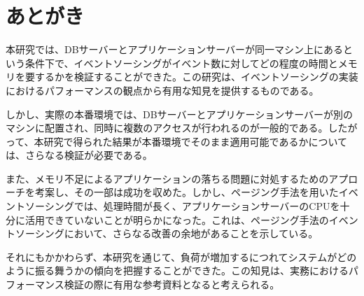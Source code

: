 \documentclass[../../main]{subfiles}
\begin{document}
    \section{あとがき}\label{sec:afterword}

    本研究では、DBサーバーとアプリケーションサーバーが同一マシン上にあるという条件下で、イベントソーシングがイベント数に対してどの程度の時間とメモリを要するかを検証することができた。この研究は、イベントソーシングの実装におけるパフォーマンスの観点から有用な知見を提供するものである。

    しかし、実際の本番環境では、DBサーバーとアプリケーションサーバーが別のマシンに配置され、同時に複数のアクセスが行われるのが一般的である。したがって、本研究で得られた結果が本番環境でそのまま適用可能であるかについては、さらなる検証が必要である。

    また、メモリ不足によるアプリケーションの落ちる問題に対処するためのアプローチを考案し、その一部は成功を収めた。しかし、ページング手法を用いたイベントソーシングでは、処理時間が長く、アプリケーションサーバーのCPUを十分に活用できていないことが明らかになった。これは、ページング手法のイベントソーシングにおいて、さらなる改善の余地があることを示している。

    それにもかかわらず、本研究を通じて、負荷が増加するにつれてシステムがどのように振る舞うかの傾向を把握することができた。この知見は、実務におけるパフォーマンス検証の際に有用な参考資料となると考えられる。

    \clearpage
\end{document}

